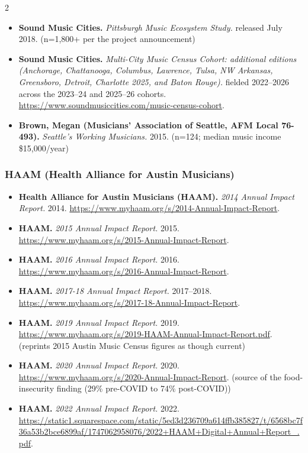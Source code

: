 {\begin{multicols}{2}
\begin{itemize}[itemsep=0pt,topsep=1pt,parsep=0pt,partopsep=0pt,leftmargin=1em]
\item \textbf{Sound Music Cities.} \textit{Pittsburgh Music Ecosystem Study.} released July 2018. {\color{ammuted}(n=1,800+ per the project announcement)}
\item \textbf{Sound Music Cities.} \textit{Multi-City Music Census Cohort: additional editions (Anchorage, Chattanooga, Columbus, Lawrence, Tulsa, NW Arkansas, Greensboro, Detroit, Charlotte 2025, and Baton Rouge).} fielded 2022--2026 across the 2023--24 and 2025--26 cohorts. \url{https://www.soundmusiccities.com/music-census-cohort}.
\item \textbf{Brown, Megan (Musicians’ Association of Seattle, AFM Local 76-493).} \textit{Seattle’s Working Musicians.} 2015. {\color{ammuted}(n=124; median music income \$15,000/year)}
\end{itemize}
\subsubsection*{HAAM (Health Alliance for Austin Musicians)}
\begin{itemize}[itemsep=0pt,topsep=1pt,parsep=0pt,partopsep=0pt,leftmargin=1em]
\item \textbf{Health Alliance for Austin Musicians (HAAM).} \textit{2014 Annual Impact Report.} 2014. \url{https://www.myhaam.org/s/2014-Annual-Impact-Report}.
\item \textbf{HAAM.} \textit{2015 Annual Impact Report.} 2015. \url{https://www.myhaam.org/s/2015-Annual-Impact-Report}.
\item \textbf{HAAM.} \textit{2016 Annual Impact Report.} 2016. \url{https://www.myhaam.org/s/2016-Annual-Impact-Report}.
\item \textbf{HAAM.} \textit{2017-18 Annual Impact Report.} 2017--2018. \url{https://www.myhaam.org/s/2017-18-Annual-Impact-Report}.
\item \textbf{HAAM.} \textit{2019 Annual Impact Report.} 2019. \url{https://www.myhaam.org/s/2019-HAAM-Annual-Impact-Report.pdf}. {\color{ammuted}(reprints 2015 Austin Music Census figures as though current)}
\item \textbf{HAAM.} \textit{2020 Annual Impact Report.} 2020. \url{https://www.myhaam.org/s/2020-Annual-Impact-Report}. {\color{ammuted}(source of the food-insecurity finding (29\% pre-COVID to 74\% post-COVID))}
\item \textbf{HAAM.} \textit{2022 Annual Impact Report.} 2022. \url{https://static1.squarespace.com/static/5ed3d236709a614ffb385827/t/6568bc7f36a53b2bce6899af/1747062958076/2022+HAAM+Digital+Annual+Report_.pdf}.

\end{itemize}
\end{multicols}}
